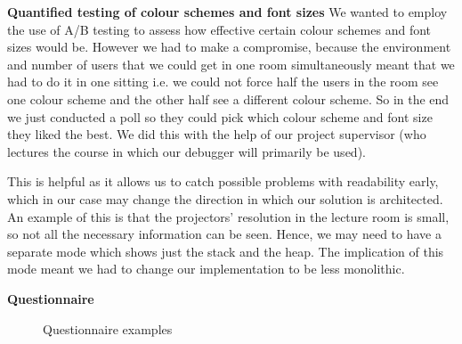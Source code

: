 \documentclass[11pt, a4paper]{article}
\begin{document}
\textbf{Quantified testing of colour schemes and font sizes}
We wanted to employ the use of A/B testing to assess how effective certain colour schemes and font sizes would be.
However we had to make a compromise, because the environment and number of users that we could get in one room simultaneously meant that we had to do it in one sitting i.e. we could not force half the users in the room see one colour scheme and the other half see a different colour scheme.
So in the end we just conducted a poll so they could pick which colour scheme and font size they liked the best.
We did this with the help of our project supervisor (who lectures the course in which our debugger will primarily be used).

This is helpful as it allows us to catch possible problems with readability early, which in our case may change the direction in which our solution is architected.
An example of this is that the projectors’ resolution in the lecture room is small, so not all the necessary information can be seen.
Hence, we may need to have a separate mode which shows just the stack and the heap.
The implication of this mode meant we had to change our implementation to be less monolithic.

\textbf{Questionnaire}
\begin{figure}[h!]
\centering
{}
\quad
{}
\caption{Questionnaire examples}
\end{figure}
\end{document}
